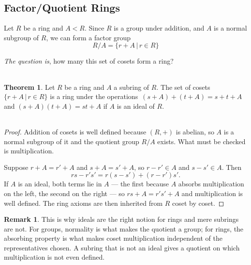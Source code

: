 \documentclass[11pt,a4paper]{article}
\theoremstyle{definition}
\newtheorem{thm}{Theorem}[subsection]
\newtheorem*{remark}{Remark}
\begin{document}
\subsection{Factor/Quotient Rings}
Let $R$ be a ring and $A<R$. Since $R$ is a group under addition, and  $A$ is a normal subgroup of $R$, we can form a factor group 
$$ R/A = \{ r + A\, |\, r\in R\}$$


\textit{The question is}, how many this set of cosets form a ring?\\\\



\begin{thm}
Let $R$ be a ring and $A$ a subring of $R$. The set of cosets $\{ r + A\, |\, r\in R\}$ is a ring under the operations $\, (s + A) + (t + A) = s + t + A\, $ and $(s + A)(t + A) = st + A$ if $A$ is an ideal of $R$.\\\\
\end{thm}

\begin{proof}
Addition of cosets is well defined because $(R,+)$ is abelian, so $A$ is a normal
subgroup of it and the quotient group $R/A$ exists. What must be checked is
multiplication.

Suppose $r + A = r' + A$ and $s + A = s' + A$, so $r-r'\in A$ and $s-s'\in A$.
Then
$$rs - r's' = r(s-s') + (r-r')s' .$$
If $A$ is an ideal, both terms lie in $A$ --- the first because $A$ absorbs
multiplication on the left, the second on the right --- so $rs + A = r's' + A$
and multiplication is well defined. The ring axioms are then inherited from $R$
coset by coset.
\end{proof}

\begin{remark}
This is why ideals are the right notion for rings and mere subrings are not. For
groups, normality is what makes the quotient a group; for rings, the absorbing
property is what makes coset multiplication independent of the representatives
chosen. A subring that is not an ideal gives a quotient on which multiplication
is not even defined.
\end{remark}
\end{document}
